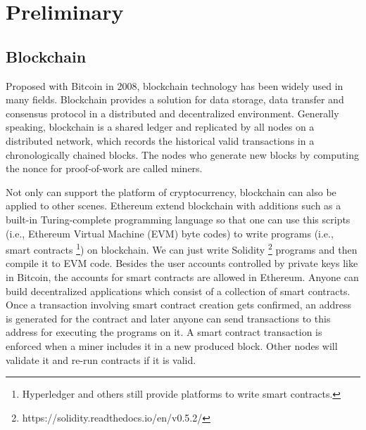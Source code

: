 \documentclass[conference]{IEEEtran}
\begin{document}
\section{Preliminary}
\label{preli}

	\subsection{Blockchain}
	Proposed with Bitcoin \cite{nakamoto2008bitcoin} in 2008, blockchain technology has been widely used in many fields. Blockchain provides a solution for data storage, data transfer and consensus protocol in a distributed and decentralized environment. Generally speaking, blockchain is a shared ledger and replicated by all nodes on a distributed network, which records the historical valid transactions in a chronologically chained blocks. The nodes who generate new blocks by computing the nonce for proof-of-work are called miners.
	
	Not only can support the platform of cryptocurrency, blockchain can also be applied to other scenes. Ethereum \cite{wood2014ethereum} extend blockchain with additions such as a built-in Turing-complete programming language so that one can use this scripts (i.e., Ethereum Virtual Machine (EVM) byte codes) to write programs (i.e., smart contracts \footnote{Hyperledger and others still provide platforms to write smart contracts.}) on blockchain. We can just write Solidity \footnote{https://solidity.readthedocs.io/en/v0.5.2/} programs and then compile it to EVM code. Besides the user accounts controlled by private keys like in Bitcoin, the accounts for smart contracts are allowed in Ethereum. Anyone can build decentralized applications which consist of a collection of smart contracts. Once a transaction involving smart contract creation gets confirmed, an address is generated for the contract and later anyone can send transactions to this address for executing the programs on it. A smart contract transaction is enforced when a miner includes it in a new produced block. Other nodes will validate it and re-run contracts if it is valid.
	
\end{document}
